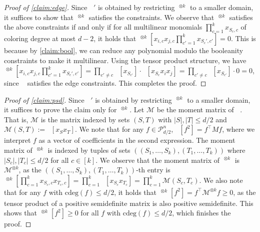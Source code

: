 \documentclass[10pt,a4paper]{article}
\theoremstyle{definition}
\newcommand{\cP}{\mathcal P}
\DeclareMathOperator{\pE}{\tilde{\mathbb{E}}}
\def\abs#1{\left|#1  \right|}
\newcommand{\M}{\mathcal{M}}
\newcommand{\cdeg}{\mathrm{cdeg}}
\newcommand{\numcolors}{k}
\begin{document}
\begin{proof}[Proof of \cref{claim:edge}]
Since $\pE'$ is obtained by restricting $\pE^{\otimes \numcolors}$ to a smaller domain, it suffices to show that $\pE^{\otimes \numcolors}$ satisfies the constraints. We observe that $\pE^{\otimes \numcolors}$ satisfies the above constraints if and only if for all multilinear monomials $\prod_{c = 1}^\numcolors x_{S_c,c}$ of coloring degree at most $d-2$, it holds that $\pE^{\otimes \numcolors} [x_{i,c} x_{j,c} \prod_{c' = 1}^\numcolors x_{S_c', c'}] = 0$. This is because by \cref{claim:bool}, we can reduce any polynomial modulo the booleanity constraints to make it multilinear. Using the tensor product structure, we have $\pE^{\otimes \numcolors} [x_{i,c} x_{j,c} \prod_{c' = 1}^\numcolors x_{S_c', c'}] = \prod_{c' \ne c} \pE[x_{S_{c'}}] \cdot \pE[x_{S_c} x_i x_j] = \prod_{c' \ne c} \pE[x_{S_{c'}}] \cdot 0 = 0$, since $\pE$ satisfies the edge constraints. This completes the proof.
\end{proof}

\begin{proof}[Proof of \cref{claim:psd}]
Since $\pE'$ is obtained by restricting $\pE^{\otimes \numcolors}$ to a smaller domain, it suffices to prove the claim only for $\pE^{\otimes \numcolors}$. Let $\M$ be the moment matrix of $\pE$. That is, $\M$ is the matrix indexed by sets $(S,T)$ with $\abs{S}, \abs{T} \leq d/2$ and $\M(S,T) := \pE[x_S x_T]$. We note that for any $f \in \cP^n_{d/2}$, $\pE[f^2] = f^{\top} M f$, where we interpret $f$ as a vector of coefficients in the second expression. The moment matrix of $\pE^{\otimes \numcolors}$ is indexed by tuples of sets $((S_1, \dots, S_\numcolors), (T_1, \dots, T_\numcolors))$ where $\abs{S_c}, \abs{T_c} \leq d/2$ for all $c \in [\numcolors]$. We observe that the moment matrix of $\pE^{\otimes \numcolors}$ is $\M^{\otimes \numcolors}$, as the $((S_1, \dots, S_\numcolors), (T_1, \dots, T_\numcolors))$-th entry is $\pE^{\otimes \numcolors}[\prod_{c = 1}^\numcolors x_{S_c, c} x_{T_c, c}] = \prod_{c = 1}^\numcolors \pE[x_{S_c} x_{T_c}] = \prod_{c = 1}^\numcolors \M(S_c, T_c)$. We also note that for any $f$ with $\cdeg(f) \leq d/2$, it holds that $\pE^{\otimes \numcolors}[f^2]  = f^{\top} \M^{\otimes \numcolors}f \geq 0$, as the tensor product of a positive semidefinite matrix is also positive semidefinite. This shows that $\pE^{\otimes \numcolors}[f^2] \geq 0$ for all $f$ with $\cdeg(f) \leq d/2$, which finishes the proof.
\end{proof}
\end{document}
